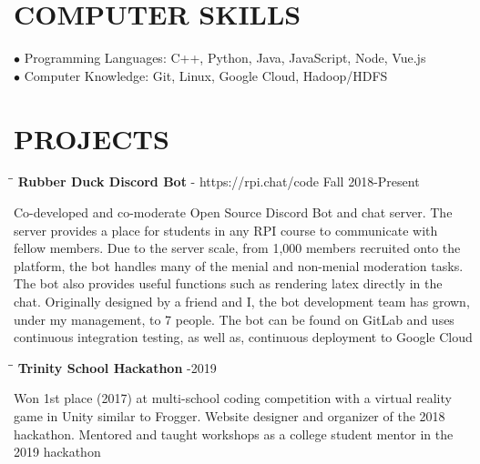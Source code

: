 \documentclass{res}
\begin{document}
\begin{resume}
\vspace{-0.1in}
\section{COMPUTER SKILLS}
    $\bullet$  Programming Languages: C++, Python, Java, JavaScript, Node, Vue.js\\
     $\bullet$ Computer Knowledge: Git, Linux, Google Cloud, Hadoop/HDFS

\vspace{-0.1in}
\section{PROJECTS}
	\vspace{-0.1in}
	\begin{tabbing}
   \hspace{2.3in}\= \hspace{3.6in}\= \kill
    {\bf Rubber Duck Discord Bot} - https://rpi.chat/code \>   \>Fall 2018-Present
   \end{tabbing}\vspace{-20pt}
   Co-developed and co-moderate Open Source Discord Bot and chat server. The server provides a place for students in any RPI course to communicate with fellow members. Due to the server scale, from 1,000 members recruited onto the platform, the bot handles many of the menial and non-menial moderation tasks. The bot also provides useful functions such as rendering latex directly in the chat. Originally designed by a friend and I, the bot development team has grown, under my management, to 7 people. The bot can be found on GitLab and uses continuous integration testing, as well as, continuous deployment to Google Cloud
	\vspace{-15pt}
	\begin{tabbing}
   \hspace{2.3in}\= \hspace{4in}\= \kill
    {\bf Trinity School Hackathon} \>  -2019
   \end{tabbing}\vspace{-20pt}
	Won 1st place (2017) at multi-school coding competition with a virtual reality game in Unity similar to Frogger. Website designer and organizer of the 2018 hackathon. Mentored and taught workshops as a college student mentor in the 2019 hackathon



\end{resume}
\end{document}
